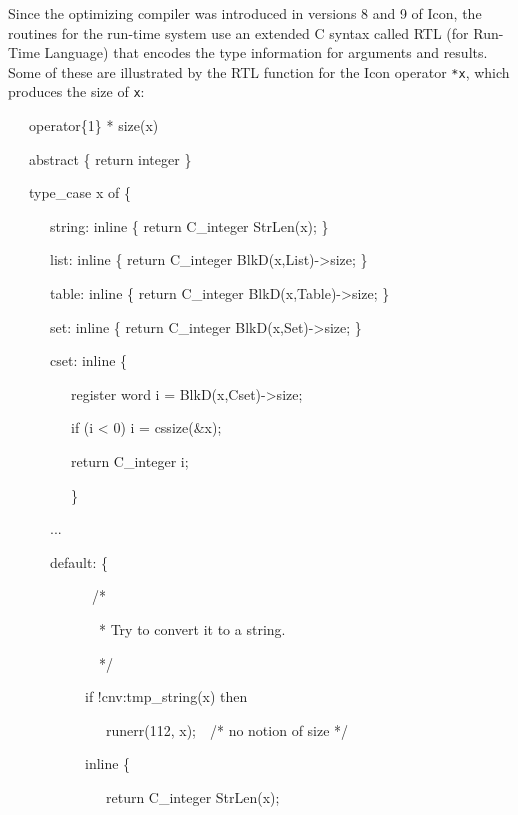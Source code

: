Since the optimizing compiler was introduced in versions 8 and 9 of
Icon, the routines for the run-time system use an extended C syntax
called RTL (for Run-Time Language) that encodes the type information
for arguments and results. Some of these are illustrated by the RTL
function for the Icon operator \texttt{*x}, which produces the size of
\texttt{x}:

{\ttfamily\mdseries
\ \ \ operator\{1\} * size(x)}

{\ttfamily\mdseries
\ \ \ abstract \{ return integer \}}

{\ttfamily\mdseries
\ \ \ type\_case x of \{}

{\ttfamily\mdseries
\ \ \ \ \ \ string: inline \{ return C\_integer StrLen(x); \}}

{\ttfamily\mdseries
\ \ \ \ \ \ list: inline \{ return C\_integer BlkD(x,List)-{\textgreater}size; \}}

{\ttfamily\mdseries
\ \ \ \ \ \ table: inline \{ return C\_integer BlkD(x,Table)-{\textgreater}size; \}}

{\ttfamily\mdseries
\ \ \ \ \ \ set: inline \{ return C\_integer BlkD(x,Set)-{\textgreater}size; \}}

{\ttfamily\mdseries
\ \ \ \ \ \ cset: inline \{}

{\ttfamily\mdseries
\ \ \ \ \ \ \ \ \ register word i = BlkD(x,Cset)-{\textgreater}size;}

{\ttfamily\mdseries
\ \ \ \ \ \ \ \ \ if (i {\textless} 0) i = cssize(\&x);}

{\ttfamily\mdseries
\ \ \ \ \ \ \ \ \ return C\_integer i;}

{\ttfamily\mdseries
\ \ \ \ \ \ \ \ \ \}}

{\ttfamily\mdseries
\ \ \ \ \ \ ...}

{\ttfamily\mdseries
\ \ \ \ \ \ default: \{}

{\ttfamily\mdseries
\ \ \ \ \ \ \ \ \ \ \ \ /*}

{\ttfamily\mdseries
\ \ \ \ \ \ \ \ \ \ \ \ \ * Try to convert it to a string.}

{\ttfamily\mdseries
\ \ \ \ \ \ \ \ \ \ \ \ \ */}

{\ttfamily\mdseries
\ \ \ \ \ \ \ \ \ \ \ if !cnv:tmp\_string(x) then}

{\ttfamily\mdseries
\ \ \ \ \ \ \ \ \ \ \ \ \ \ runerr(112, x);\ \ /* no notion of size */}

{\ttfamily\mdseries
\ \ \ \ \ \ \ \ \ \ \ inline \{}

{\ttfamily\mdseries
\ \ \ \ \ \ \ \ \ \ \ \ \ \ return C\_integer StrLen(x);}


